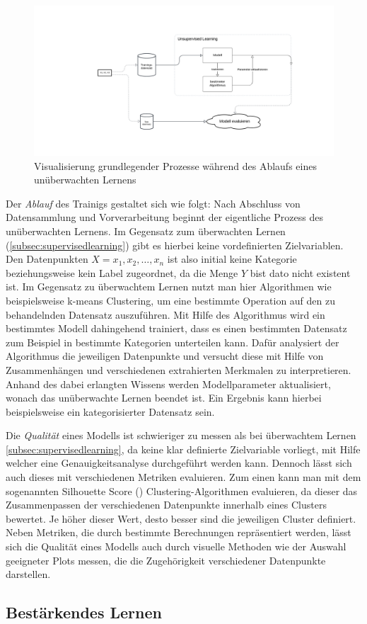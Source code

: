 \begin{figure}[H]\label{img:unsupervisedworkflow}
	\hspace{-15mm}
	\centering
	\includegraphics[width=0.8\linewidth]{Bilder/UnsupervisedLearning.png}
	\caption{Visualisierung grundlegender Prozesse während des Ablaufs eines unüberwachten Lernens}
\end{figure}
Der \textit{Ablauf} des Trainigs gestaltet sich wie folgt: Nach Abschluss von Datensammlung und Vorverarbeitung beginnt der eigentliche Prozess des unüberwachten Lernens. Im Gegensatz zum überwachten Lernen (\ref{subsec:supervisedlearning}) gibt es hierbei keine vordefinierten Zielvariablen. Den Datenpunkten $X = x_1, x_2, \ldots, x_n$ ist also initial keine Kategorie beziehungsweise kein Label zugeordnet, da die Menge $Y$ bist dato nicht existent ist. Im Gegensatz zu überwachtem Lernen nutzt man hier Algorithmen wie beispielsweise k-means Clustering, um eine bestimmte Operation auf den zu behandelnden Datensatz auszuführen. Mit Hilfe des Algorithmus wird ein bestimmtes Modell dahingehend trainiert, dass es einen bestimmten Datensatz zum Beispiel in bestimmte Kategorien unterteilen kann. Dafür analysiert der Algorithmus die jeweiligen Datenpunkte und versucht diese mit Hilfe von Zusammenhängen und verschiedenen extrahierten Merkmalen zu interpretieren. Anhand des dabei erlangten Wissens werden Modellparameter aktualisiert, wonach das unüberwachte Lernen beendet ist. Ein Ergebnis kann hierbei beispielsweise ein kategorisierter Datensatz sein.

Die  \textit{Qualität} eines Modells ist schwieriger zu messen als bei überwachtem Lernen \ref{subsec:supervisedlearning}, da keine klar definierte Zielvariable vorliegt, mit Hilfe welcher eine Genauigkeitsanalyse durchgeführt werden kann. Dennoch lässt sich auch dieses mit verschiedenen Metriken evaluieren. Zum einen kann man mit dem sogenannten Silhouette Score (\cite{shahapure_cluster_2020}) Clustering-Algorithmen evaluieren, da dieser das Zusammenpassen der verschiedenen Datenpunkte innerhalb eines Clusters bewertet. Je höher dieser Wert, desto besser sind die jeweiligen Cluster definiert. Neben Metriken, die durch bestimmte Berechnungen repräsentiert werden, lässt sich die Qualität eines Modells auch durch visuelle Methoden wie der Auswahl geeigneter Plots messen, die die Zugehörigkeit verschiedener Datenpunkte darstellen.
\subsection{Bestärkendes Lernen}